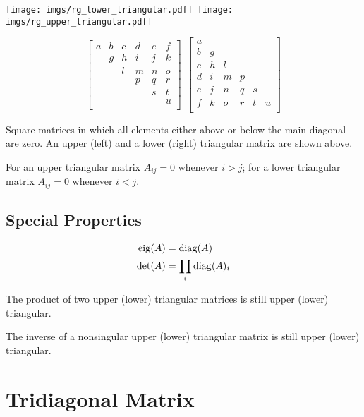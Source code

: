 \begin{center}
\texttt{[image: imgs/rg\_lower\_triangular.pdf]}~\texttt{[image: imgs/rg\_upper\_triangular.pdf]}
\end{center}

\begin{equation}
\begin{bmatrix}
a & b & c & d & e & f \\
  & g & h & i & j & k \\
  &   & l & m & n & o \\
  &   &   & p & q & r \\
  &   &   &   & s & t \\
  &   &   &   &   & u \\
\end{bmatrix}
~
~
\begin{bmatrix}
a &   &   &   &   &   \\
b & g &   &   &   &   \\
c & h & l &   &   &   \\
d & i & m & p &   &   \\
e & j & n & q & s &   \\
f & k & o & r & t & u \\
\end{bmatrix}
\end{equation}

Square matrices in which all elements either above or below the main diagonal are zero. An upper (left) and a lower (right) triangular matrix are shown above.

For an upper triangular matrix $A_{ij}=0$ whenever $i>j$; for a lower triangular matrix $A_{ij}=0$ whenever $i<j$.


\subsection*{Special Properties}

\begin{align}
\operatorname{eig}(A) &= \operatorname{diag}(A)             \\
\det(A) &= \prod_i \operatorname{diag}(A)_i
\end{align}

The product of two upper (lower) triangular matrices is still upper (lower) triangular.

The inverse of a nonsingular upper (lower) triangular matrix is still upper (lower) triangular.


\section{Tridiagonal Matrix}

